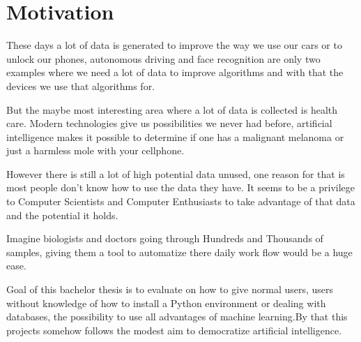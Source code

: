 \chapter{Motivation}

These days a lot of data is generated to improve the way we use our cars or to unlock our phones, autonomous driving and face recognition are only two examples where we need a lot of data to improve algorithms and with that the devices we use that algorithms for. 

But the maybe most interesting area where a lot of data is collected is health care. Modern technologies give us possibilities we never had before, artificial intelligence makes it possible to determine if one has a malignant melanoma or just a harmless mole with your cellphone. 

However there is still a lot of high potential data unused, one reason for that is most people don't know how to use the data they have. It seems to be a privilege to Computer Scientists and Computer Enthusiasts to take advantage of that data and the potential it holds. 

Imagine biologists and doctors going through Hundreds and Thousands of samples, giving them a tool to automatize there daily work flow would be a huge ease.

Goal of this bachelor thesis is to evaluate on how to give normal users, users without knowledge of how to install a Python environment or dealing with databases, the possibility to use all advantages of machine learning.By that this projects somehow follows the modest aim to democratize artificial intelligence.